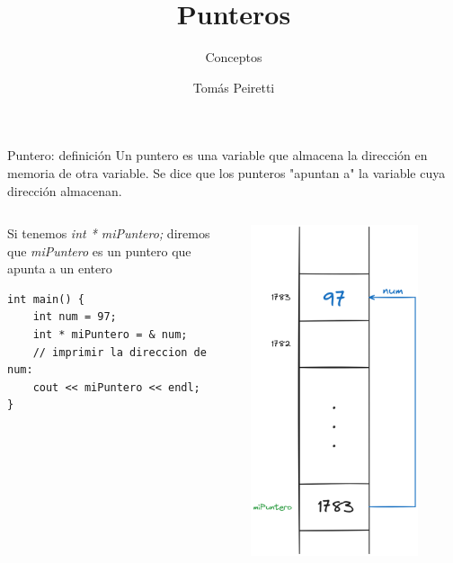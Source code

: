 \documentclass[12pt]{beamer}
\title{Punteros}
\subtitle{Conceptos}
\author{Tomás Peiretti}
\date{}
\begin{document}
\maketitle

\begin{frame}[fragile]{Puntero: definición}
    Un puntero es una \alert{variable que almacena la dirección en memoria} de otra variable. 
    Se dice que los punteros "apuntan a" la variable cuya dirección almacenan. \\
    \begin{columns}
        \begin{column}{0.7\textwidth}
            Si tenemos \textit{int \alert{*} miPuntero;} diremos que \textit{miPuntero} es un puntero que apunta a un entero
            \medskip
            \begin{lstlisting}[basicstyle=\scriptsize]
int main() {
    int num = 97;
    int * miPuntero = & num;
    // imprimir la direccion de num:
    cout << miPuntero << endl;
}
\end{lstlisting}
        \end{column}
        \begin{column}{0.3\textwidth}
            \includegraphics[width=0.8\textwidth]{puntero.png}
        \end{column}
    \end{columns}
\end{frame}
\end{document}

